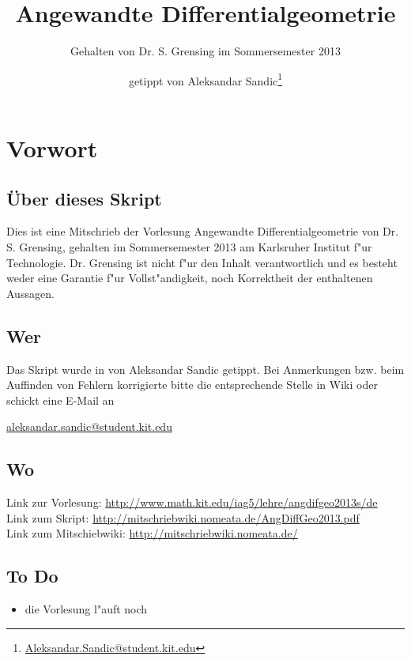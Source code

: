 \documentclass[paper=A4, twoside, chapterprefix=true, bibliography=totoc, headsepline]{scrbook}
\title{Angewandte Differentialgeometrie}
\subtitle{Gehalten von Dr. S. Grensing im Sommersemester 2013}
\author{getippt von Aleksandar Sandic\thanks{\href{mailto:aleksandar.sandic@student.kit.edu}{Aleksandar.Sandic@student.kit.edu}}}
\theoremstyle{break}
\theoremstyle{nonumberbreak}
\theoremstyle{emptybreak}
\theoremstyle{break}
\newcommand{\quot}[1]{\textrm{\glqq}{#1}\textrm{\grqq}}
\begin{document}
\maketitle

\setlength\parskip{0.6pt}
\tableofcontents

\chapter*{Vorwort}

\section*{\"Uber dieses Skript}
Dies ist eine Mitschrieb der Vorlesung \quot{Angewandte Differentialgeometrie} von Dr. S. Grensing, gehalten im Sommersemester 2013 am Karlsruher Institut f"ur Technologie.
Dr. Grensing ist nicht f"ur den Inhalt verantwortlich und es besteht weder eine Garantie f"ur Vollst"andigkeit, noch Korrektheit der enthaltenen Aussagen.

\section*{Wer}
Das Skript wurde in von Aleksandar Sandic getippt.
Bei Anmerkungen bzw. beim Auffinden von Fehlern korrigierte bitte die entsprechende Stelle in Wiki oder schickt eine E-Mail an
\begin{center}
	\href{mailto:aleksandar.sandic@student.kit.edu}{aleksandar.sandic@student.kit.edu}
\end{center}

\section*{Wo}
Link zur Vorlesung: \url{http://www.math.kit.edu/iag5/lehre/angdifgeo2013s/de}\\
Link zum Skript: \url{http://mitschriebwiki.nomeata.de/AngDiffGeo2013.pdf}\\
Link zum Mitschiebwiki: \url{http://mitschriebwiki.nomeata.de/}

\section*{To Do}\begin{itemize}
\item die Vorlesung l"auft noch
\end{itemize}
\end{document}
